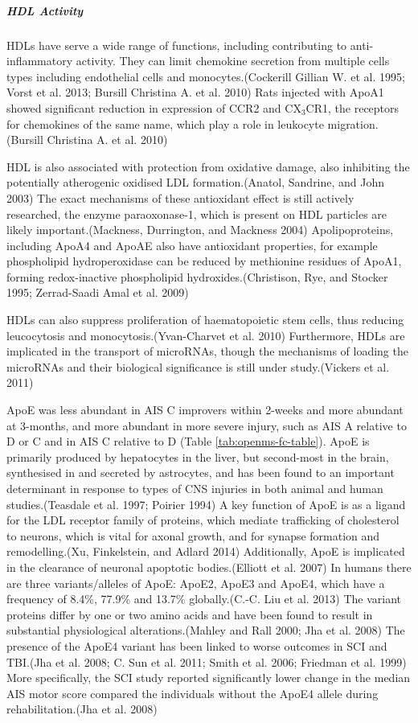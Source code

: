 \documentclass[9pt,lineno]{elife}
\begin{document}
\begin{landscape}
\begin{landscape}
\hypertarget{hdl-activity}{%
\subparagraph{HDL Activity}\label{hdl-activity}}

HDLs have serve a wide range of functions, including contributing to anti-inflammatory activity.
They can limit chemokine secretion from multiple cells types including endothelial cells and monocytes.(Cockerill Gillian W. et al. 1995; Vorst et al. 2013; Bursill Christina A. et al. 2010) Rats injected with ApoA1 showed significant reduction in expression of CCR2 and CX\(_3\)CR1, the receptors for chemokines of the same name, which play a role in leukocyte migration.
(Bursill Christina A. et al. 2010)

HDL is also associated with protection from oxidative damage, also inhibiting the potentially atherogenic oxidised LDL formation.(Anatol, Sandrine, and John 2003) The exact mechanisms of these antioxidant effect is still actively researched, the enzyme paraoxonase-1, which is present on HDL particles are likely important.(Mackness, Durrington, and Mackness 2004) Apolipoproteins, including ApoA4 and ApoAE also have antioxidant properties, for example phospholipid hydroperoxidase can be reduced by methionine residues of ApoA1, forming redox-inactive phospholipid hydroxides.(Christison, Rye, and Stocker 1995; Zerrad-Saadi Amal et al. 2009)

HDLs can also suppress proliferation of haematopoietic stem cells, thus reducing leucocytosis and monocytosis.(Yvan-Charvet et al. 2010) Furthermore, HDLs are implicated in the transport of microRNAs, though the mechanisms of loading the microRNAs and their biological significance is still under study.(Vickers et al. 2011)

ApoE was less abundant in AIS C improvers within 2-weeks and more abundant at 3-months, and more abundant in more severe injury, such as AIS A relative to D or C and in AIS C relative to D (Table \ref{tab:openms-fc-table}).
ApoE is primarily produced by hepatocytes in the liver, but second-most in the brain, synthesised in and secreted by astrocytes, and has been found to an important determinant in response to types of CNS injuries in both animal and human studies.(Teasdale et al. 1997; Poirier 1994) A key function of ApoE is as a ligand for the LDL receptor family of proteins, which mediate trafficking of cholesterol to neurons, which is vital for axonal growth, and for synapse formation and remodelling.(Xu, Finkelstein, and Adlard 2014) Additionally, ApoE is implicated in the clearance of neuronal apoptotic bodies.(Elliott et al. 2007) In humans there are three variants/alleles of ApoE: ApoE2, ApoE3 and ApoE4, which have a frequency of 8.4\%, 77.9\% and 13.7\% globally.(C.-C. Liu et al. 2013) The variant proteins differ by one or two amino acids and have been found to result in substantial physiological alterations.(Mahley and Rall 2000; Jha et al. 2008) The presence of the ApoE4 variant has been linked to worse outcomes in SCI and TBI.(Jha et al. 2008; C. Sun et al. 2011; Smith et al. 2006; Friedman et al. 1999) More specifically, the SCI study reported significantly lower change in the median AIS motor score compared the individuals without the ApoE4 allele during rehabilitation.(Jha et al. 2008)


\end{landscape}
\end{landscape}
\end{document}
